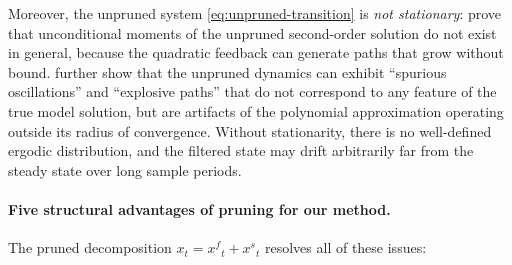 \documentclass[12pt,a4paper]{article}
\newcommand{\xf}{{x^{f}}}
\newcommand{\xs}{{x^{s}}}
\begin{document}
Moreover, the unpruned system \eqref{eq:unpruned-transition} is
\emph{not stationary}: \citet{andreasen2018pruned} prove that
unconditional moments of the unpruned second-order solution do not
exist in general, because the quadratic feedback can generate paths
that grow without bound. \citet{denhaan2012solving} further show
that the unpruned dynamics can exhibit ``spurious oscillations'' and
``explosive paths'' that do not correspond to any feature of the true
model solution, but are artifacts of the polynomial approximation
operating outside its radius of convergence. Without stationarity,
there is no well-defined ergodic distribution, and the filtered
state may drift arbitrarily far from the steady state over long
sample periods.

\paragraph{Five structural advantages of pruning for our method.}
The pruned decomposition $x_t = \xf_t + \xs_t$ resolves all of
these issues:
\end{document}
